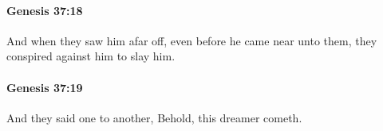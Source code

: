		\paragraph{Genesis 37:18} %
			\label{GENESIS-37-18}

			And when they saw him afar off, even before he came near unto them, they conspired against him to slay him.


		\paragraph{Genesis 37:19} %
			\label{GENESIS-37-19}

			And they said one to another, Behold, this dreamer cometh.


